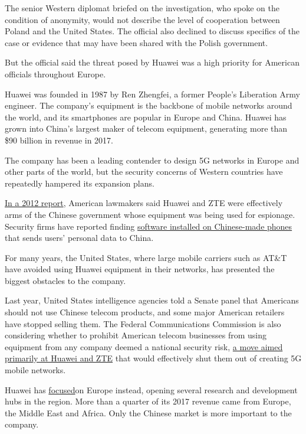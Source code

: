 The senior Western diplomat briefed on the investigation, who spoke on
the condition of anonymity, would not describe the level of cooperation
between Poland and the United States. The official also declined to
discuss specifics of the case or evidence that may have been shared with
the Polish government.

But the official said the threat posed by Huawei was a high priority for
American officials throughout Europe.

Huawei was founded in 1987 by Ren Zhengfei, a former People's Liberation
Army engineer. The company's equipment is the backbone of mobile
networks around the world, and its smartphones are popular in Europe and
China. Huawei has grown into China's largest maker of telecom equipment,
generating more than \$90 billion in revenue in 2017.

The company has been a leading contender to design 5G networks in Europe
and other parts of the world, but the security concerns of Western
countries have repeatedly hampered its expansion plans.

\href{https://www.nytimes.com/2012/10/09/us/us-panel-calls-huawei-and-zte-national-security-threat.html}{In
a 2012 report}, American lawmakers said Huawei and ZTE were effectively
arms of the Chinese government whose equipment was being used for
espionage. Security firms have reported finding
\href{https://www.nytimes.com/2016/11/16/us/politics/china-phones-software-security.html}{software
installed on Chinese-made phones} that sends users' personal data to
China.

For many years, the United States, where large mobile carriers such as
AT\&T have avoided using Huawei equipment in their networks, has
presented the biggest obstacles to the company.

Last year, United States intelligence agencies told a Senate panel that
Americans should not use Chinese telecom products, and some major
American retailers have stopped selling them. The Federal Communications
Commission is also considering whether to prohibit American telecom
businesses from using equipment from any company deemed a national
security risk,
\href{https://www.nytimes.com/2018/04/17/technology/huawei-trade-war.html}{a
move aimed primarily at Huawei and ZTE} that would effectively shut them
out of creating 5G mobile networks.

Huawei has
\href{https://www.nytimes.com/2018/04/17/technology/china-huawei-washington.html?module=inline}{focused}on
Europe instead, opening several research and development hubs in the
region. More than a quarter of its 2017 revenue came from Europe, the
Middle East and Africa. Only the Chinese market is more important to the
company.


